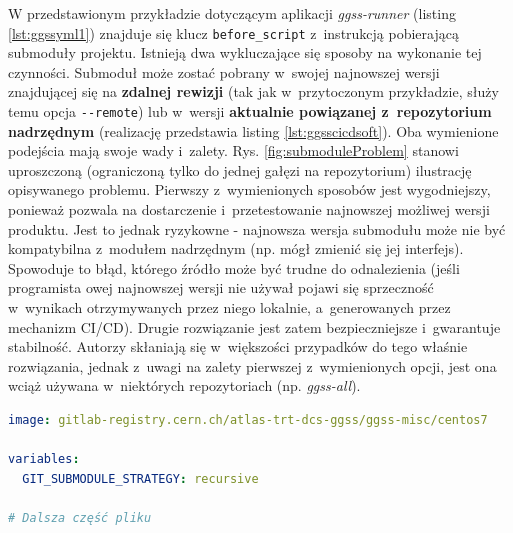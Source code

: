 W przedstawionym przykładzie dotyczącym aplikacji \textit{ggss-runner} (listing \ref{lst:ggssyml1}) znajduje się klucz \lstinline{before_script} z~instrukcją pobierającą submoduły projektu. Istnieją dwa wykluczające się sposoby na wykonanie tej czynności. Submoduł może zostać pobrany w~swojej najnowszej wersji znajdującej się na \textbf{zdalnej rewizji} (tak jak w~przytoczonym przykładzie, służy temu opcja \lstinline{--remote}) lub w~wersji \textbf{aktualnie powiązanej z~repozytorium nadrzędnym} (realizację przedstawia listing \ref{lst:ggsscicdsoft}). Oba wymienione podejścia mają swoje wady i~zalety. Rys. \ref{fig:submoduleProblem} stanowi uproszczoną (ograniczoną tylko do jednej gałęzi na repozytorium) ilustrację opisywanego problemu. Pierwszy z~wymienionych sposobów jest wygodniejszy, ponieważ pozwala na dostarczenie i~przetestowanie najnowszej możliwej wersji produktu. Jest to jednak ryzykowne - najnowsza wersja submodułu może nie być kompatybilna z~modułem nadrzędnym (np. mógł zmienić się jej interfejs). Spowoduje to błąd, którego źródło może być trudne do odnalezienia (jeśli programista owej najnowszej wersji nie używał pojawi się sprzeczność w~wynikach otrzymywanych przez niego lokalnie, a~generowanych przez mechanizm CI/CD). Drugie rozwiązanie jest zatem bezpieczniejsze i~gwarantuje stabilność. Autorzy skłaniają się w~większości przypadków do tego właśnie rozwiązania, jednak z~uwagi na zalety pierwszej z~wymienionych opcji, jest ona wciąż używana w~niektórych repozytoriach (np. \textit{ggss-all}). 

\begin{lstlisting}[language=yaml,caption={Fragment pliku \textit{.gitlab-ci.yml} znajdującego się w~repozytorium \textit{ggss-software-libs} pobierający submoduły projektu w~wersji aktualnie powiązanej z~repozytorium nadrzędnym}, label={lst:ggsscicdsoft}]
image: gitlab-registry.cern.ch/atlas-trt-dcs-ggss/ggss-misc/centos7

variables:
  GIT_SUBMODULE_STRATEGY: recursive

# Dalsza część pliku

\end{lstlisting}

